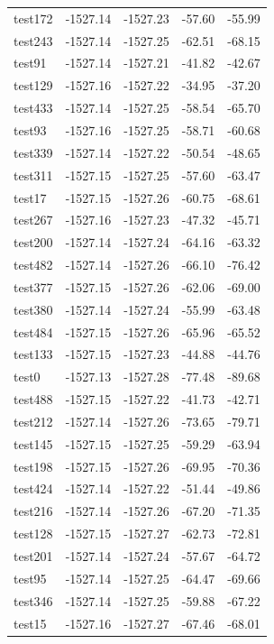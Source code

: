\documentclass[journal=jacsat,manuscript=article]{achemso}
\begin{document}
\begin{table}[b!]
\begin{tabular}{lrrrr}
test172 &  -1527.14 &  -1527.23 &  -57.60 &  -55.99 \\
test243 &  -1527.14 &  -1527.25 &  -62.51 &  -68.15 \\
test91  &  -1527.14 &  -1527.21 &  -41.82 &  -42.67 \\
test129 &  -1527.16 &  -1527.22 &  -34.95 &  -37.20 \\
test433 &  -1527.14 &  -1527.25 &  -58.54 &  -65.70 \\
test93  &  -1527.16 &  -1527.25 &  -58.71 &  -60.68 \\
test339 &  -1527.14 &  -1527.22 &  -50.54 &  -48.65 \\
test311 &  -1527.15 &  -1527.25 &  -57.60 &  -63.47 \\
test17  &  -1527.15 &  -1527.26 &  -60.75 &  -68.61 \\
test267 &  -1527.16 &  -1527.23 &  -47.32 &  -45.71 \\
test200 &  -1527.14 &  -1527.24 &  -64.16 &  -63.32 \\
test482 &  -1527.14 &  -1527.26 &  -66.10 &  -76.42 \\
test377 &  -1527.15 &  -1527.26 &  -62.06 &  -69.00 \\
test380 &  -1527.14 &  -1527.24 &  -55.99 &  -63.48 \\
test484 &  -1527.15 &  -1527.26 &  -65.96 &  -65.52 \\
test133 &  -1527.15 &  -1527.23 &  -44.88 &  -44.76 \\
test0   &  -1527.13 &  -1527.28 &  -77.48 &  -89.68 \\
test488 &  -1527.15 &  -1527.22 &  -41.73 &  -42.71 \\
test212 &  -1527.14 &  -1527.26 &  -73.65 &  -79.71 \\
test145 &  -1527.15 &  -1527.25 &  -59.29 &  -63.94 \\
test198 &  -1527.15 &  -1527.26 &  -69.95 &  -70.36 \\
test424 &  -1527.14 &  -1527.22 &  -51.44 &  -49.86 \\
test216 &  -1527.14 &  -1527.26 &  -67.20 &  -71.35 \\
test128 &  -1527.15 &  -1527.27 &  -62.73 &  -72.81 \\
test201 &  -1527.14 &  -1527.24 &  -57.67 &  -64.72 \\
test95  &  -1527.14 &  -1527.25 &  -64.47 &  -69.66 \\
test346 &  -1527.14 &  -1527.25 &  -59.88 &  -67.22 \\
test15  &  -1527.16 &  -1527.27 &  -67.46 &  -68.01 \\

\end{tabular}
\end{table}
\end{document}
